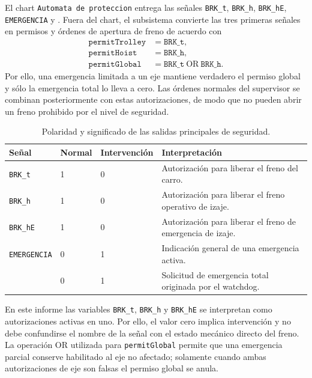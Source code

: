 \documentclass[a4paper,10pt,onecolumn,journal]{ieeeconf}
\numberwithin{equation}{section}
\begin{document}
El chart \texttt{Automata de proteccion} entrega las señales \texttt{BRK\_t}, \texttt{BRK\_h}, \texttt{BRK\_hE}, \texttt{EMERGENCIA} y . Fuera del chart, el subsistema convierte las tres primeras señales en permisos y órdenes de apertura de freno de acuerdo con
\begin{align}
\texttt{permitTrolley}&=\texttt{BRK\_t},\\
\texttt{permitHoist}&=\texttt{BRK\_h},\\
\texttt{permitGlobal}&=\texttt{BRK\_t}\ \mathrm{OR}\ \texttt{BRK\_h}.
\end{align}
Por ello, una emergencia limitada a un eje mantiene verdadero el permiso global y sólo la emergencia total lo lleva a cero. Las órdenes normales del supervisor se combinan posteriormente con estas autorizaciones, de modo que no pueden abrir un freno prohibido por el nivel de seguridad.

\begin{table}[!htbp]
\centering
\caption{Polaridad y significado de las salidas principales de seguridad.}\label{tab:polaridad_seguridad}
\begin{tabular}{L{3.4cm} C{2.0cm} C{2.0cm} L{6.2cm}}
\toprule
Señal & Normal & Intervención & Interpretación\\
\midrule
\texttt{BRK\_t} & 1 & 0 & Autorización para liberar el freno del carro.\\
\texttt{BRK\_h} & 1 & 0 & Autorización para liberar el freno operativo de izaje.\\
\texttt{BRK\_hE} & 1 & 0 & Autorización para liberar el freno de emergencia de izaje.\\
\texttt{EMERGENCIA} & 0 & 1 & Indicación general de una emergencia activa.\\
 & 0 & 1 & Solicitud de emergencia total originada por el watchdog.\\
\bottomrule
\end{tabular}
\end{table}

En este informe las variables \texttt{BRK\_t}, \texttt{BRK\_h} y \texttt{BRK\_hE} se interpretan como autorizaciones activas en uno. Por ello, el valor cero implica intervención y no debe confundirse el nombre de la señal con el estado mecánico directo del freno. La operación OR utilizada para \texttt{permitGlobal} permite que una emergencia parcial conserve habilitado al eje no afectado; solamente cuando ambas autorizaciones de eje son falsas el permiso global se anula.
\end{document}
